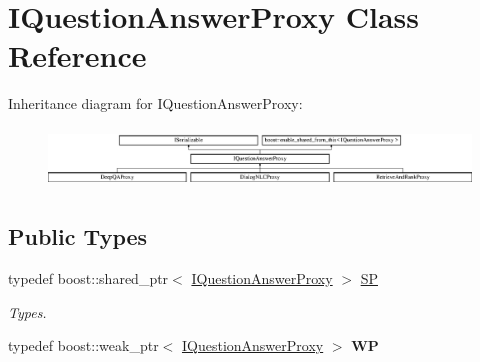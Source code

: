 \hypertarget{class_i_question_answer_proxy}{}\section{I\+Question\+Answer\+Proxy Class Reference}
\label{class_i_question_answer_proxy}
Inheritance diagram for I\+Question\+Answer\+Proxy\+:\begin{figure}[H]
\begin{center}
\leavevmode
\includegraphics[height=1.595442cm]{class_i_question_answer_proxy}
\end{center}
\end{figure}
\subsection*{Public Types}
\begin{DoxyCompactItemize}
\item 
\mbox{\label{class_i_question_answer_proxy_a32a802825699f981b41d370a2aa497d1}} 
typedef boost\+::shared\+\_\+ptr$<$ \hyperlink{class_i_question_answer_proxy}{I\+Question\+Answer\+Proxy} $>$ \hyperlink{class_i_question_answer_proxy_a32a802825699f981b41d370a2aa497d1}{SP}
\begin{DoxyCompactList}\small\item\em Types. \end{DoxyCompactList}\item 
\mbox{\label{class_i_question_answer_proxy_a681df4503a8ee754e2eb0cb942ef0fb2}} 
typedef boost\+::weak\+\_\+ptr$<$ \hyperlink{class_i_question_answer_proxy}{I\+Question\+Answer\+Proxy} $>$ {\bfseries WP}
\end{DoxyCompactItemize}
